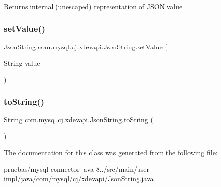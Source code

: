 \begin{DoxyReturn}{Returns}
internal (unescaped) representation of J\+S\+ON value 
\end{DoxyReturn}
\mbox{\label{classcom_1_1mysql_1_1cj_1_1xdevapi_1_1_json_string_a158d7795014b0fa7286f8094e5226458}} 
\subsubsection{\texorpdfstring{set\+Value()}{setValue()}}
{\footnotesize\ttfamily \mbox{\hyperlink{classcom_1_1mysql_1_1cj_1_1xdevapi_1_1_json_string}{Json\+String}} com.\+mysql.\+cj.\+xdevapi.\+Json\+String.\+set\+Value (\begin{DoxyParamCaption}\item[{String}]{value }\end{DoxyParamCaption})}

\mbox{\label{classcom_1_1mysql_1_1cj_1_1xdevapi_1_1_json_string_a776cb9769c5d6d3c28ba12115b8898c9}} 
\subsubsection{\texorpdfstring{to\+String()}{toString()}}
{\footnotesize\ttfamily String com.\+mysql.\+cj.\+xdevapi.\+Json\+String.\+to\+String (\begin{DoxyParamCaption}{ }\end{DoxyParamCaption})}



The documentation for this class was generated from the following file\+:\begin{DoxyCompactItemize}
\item 
pruebas/mysql-\/connector-\/java-\/8../src/main/user-\/impl/java/com/mysql/cj/xdevapi/\mbox{\hyperlink{_json_string_8java}{Json\+String.\+java}}\end{DoxyCompactItemize}
